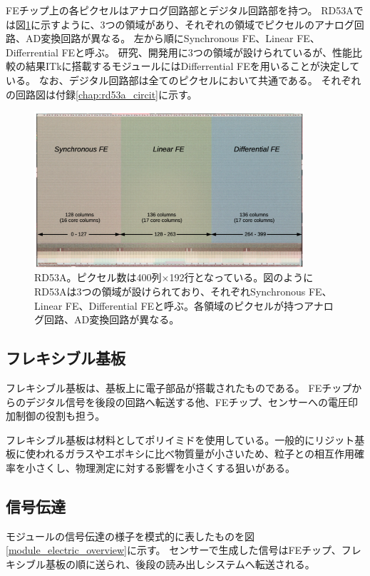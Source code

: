 FEチップ上の各ピクセルはアナログ回路部とデジタル回路部を持つ。
RD53Aでは図\ref{fechip_rd53a}に示すように、3つの領域があり、それぞれの領域でピクセルのアナログ回路、AD変換回路が異なる。
左から順にSynchronous FE、Linear FE、Differrential FEと呼ぶ。
研究、開発用に3つの領域が設けられているが、性能比較の結果ITkに搭載するモジュールにはDifferrential FEを用いることが決定している。
なお、デジタル回路部は全てのピクセルにおいて共通である。
それぞれの回路図は付録\ref{chap:rd53a_circit}に示す。

\begin{figure}[bpt]\centering
\includegraphics[width=10cm]{./fechip_rd53a.png}
\caption[RD53A]{RD53A\cite{2-1}。ピクセル数は400列$\times$192行となっている。図のようにRD53Aは3つの領域が設けられており、それぞれSynchronous FE、Linear FE、Differential FEと呼ぶ。各領域のピクセルが持つアナログ回路、AD変換回路が異なる。}
\label{fechip_rd53a}
\end{figure}

\subsection{フレキシブル基板}
フレキシブル基板は、基板上に電子部品が搭載されたものである。
FEチップからのデジタル信号を後段の回路へ転送する他、FEチップ、センサーへの電圧印加制御の役割も担う。

フレキシブル基板は材料としてポリイミドを使用している。一般的にリジット基板に使われるガラスやエポキシに比べ物質量が小さいため、粒子との相互作用確率を小さくし、物理測定に対する影響を小さくする狙いがある。

\subsection{信号伝達}
モジュールの信号伝達の様子を模式的に表したものを図\ref{module_electric_overview}に示す。
センサーで生成した信号はFEチップ、フレキシブル基板の順に送られ、後段の読み出しシステムへ転送される。

